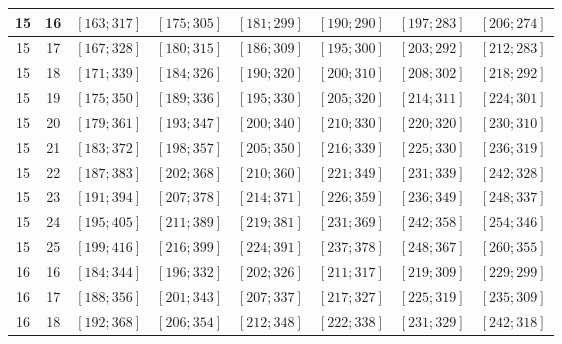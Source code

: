 \documentclass[a4paper,12pt]{article}
\begin{document}
\begin{center}
{\begin{longtable}[H]{|c|c|c|c|c|c|c|c|}
15 &  16 &  $\left[ 163; 317\right]$ &  $\left[ 175; 305\right]$ &  $\left[ 181; 299\right]$ &  $\left[ 190; 290\right]$ &  $\left[ 197; 283\right]$ &  $\left[ 206; 274\right]$ \tabularnewline \hline
15 &  17 &  $\left[ 167; 328\right]$ &  $\left[ 180; 315\right]$ &  $\left[ 186; 309\right]$ &  $\left[ 195; 300\right]$ &  $\left[ 203; 292\right]$ &  $\left[ 212; 283\right]$ \tabularnewline \hline
15 &  18 &  $\left[ 171; 339\right]$ &  $\left[ 184; 326\right]$ &  $\left[ 190; 320\right]$ &  $\left[ 200; 310\right]$ &  $\left[ 208; 302\right]$ &  $\left[ 218; 292\right]$ \tabularnewline \hline
15 &  19 &  $\left[ 175; 350\right]$ &  $\left[ 189; 336\right]$ &  $\left[ 195; 330\right]$ &  $\left[ 205; 320\right]$ &  $\left[ 214; 311\right]$ &  $\left[ 224; 301\right]$ \tabularnewline \hline
15 &  20 &  $\left[ 179; 361\right]$ &  $\left[ 193; 347\right]$ &  $\left[ 200; 340\right]$ &  $\left[ 210; 330\right]$ &  $\left[ 220; 320\right]$ &  $\left[ 230; 310\right]$ \tabularnewline \hline
15 &  21 &  $\left[ 183; 372\right]$ &  $\left[ 198; 357\right]$ &  $\left[ 205; 350\right]$ &  $\left[ 216; 339\right]$ &  $\left[ 225; 330\right]$ &  $\left[ 236; 319\right]$ \tabularnewline \hline
15 &  22 &  $\left[ 187; 383\right]$ &  $\left[ 202; 368\right]$ &  $\left[ 210; 360\right]$ &  $\left[ 221; 349\right]$ &  $\left[ 231; 339\right]$ &  $\left[ 242; 328\right]$ \tabularnewline \hline
15 &  23 &  $\left[ 191; 394\right]$ &  $\left[ 207; 378\right]$ &  $\left[ 214; 371\right]$ &  $\left[ 226; 359\right]$ &  $\left[ 236; 349\right]$ &  $\left[ 248; 337\right]$ \tabularnewline \hline
15 &  24 &  $\left[ 195; 405\right]$ &  $\left[ 211; 389\right]$ &  $\left[ 219; 381\right]$ &  $\left[ 231; 369\right]$ &  $\left[ 242; 358\right]$ &  $\left[ 254; 346\right]$ \tabularnewline \hline
15 &  25 &  $\left[ 199; 416\right]$ &  $\left[ 216; 399\right]$ &  $\left[ 224; 391\right]$ &  $\left[ 237; 378\right]$ &  $\left[ 248; 367\right]$ &  $\left[ 260; 355\right]$ \tabularnewline \hline
16 &  16 &  $\left[ 184; 344\right]$ &  $\left[ 196; 332\right]$ &  $\left[ 202; 326\right]$ &  $\left[ 211; 317\right]$ &  $\left[ 219; 309\right]$ &  $\left[ 229; 299\right]$ \tabularnewline \hline
16 &  17 &  $\left[ 188; 356\right]$ &  $\left[ 201; 343\right]$ &  $\left[ 207; 337\right]$ &  $\left[ 217; 327\right]$ &  $\left[ 225; 319\right]$ &  $\left[ 235; 309\right]$ \tabularnewline \hline
16 &  18 &  $\left[ 192; 368\right]$ &  $\left[ 206; 354\right]$ &  $\left[ 212; 348\right]$ &  $\left[ 222; 338\right]$ &  $\left[ 231; 329\right]$ &  $\left[ 242; 318\right]$ \tabularnewline \hline

\end{longtable}}
\end{center}
\end{document}
